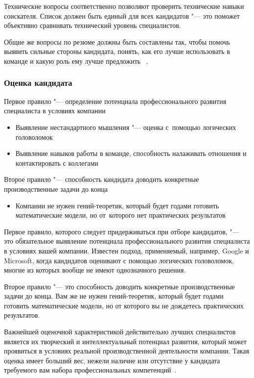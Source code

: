 \documentclass{../industrial-development}
\begin{document}
	Технические вопросы соответственно позволяют проверить технические навыки соискателя. Список должен быть единый для всех кандидатов "--- это поможет объективно сравнивать технический уровень специалистов.
	
	Общие же вопросы по резюме должны быть составлены так, чтобы помочь выявить сильные стороны кандидата, понять, как его лучше использовать в команде и какую роль ему лучше предложить
	~\cite[с.~280--281]{Pererva}.
	
	\begin{frame} \frametitle{Оценка кандидата}
		
		Первое правило "--- определение потенциала профессионального развития специалиста в условиях компании
		\begin{itemize}
			\item Выявление нестандартного мышления "--- оценка с~помощью логических головоломок
			\item Выявление навыков работы в команде, способность налаживать отношения и контактировать с коллегами
		\end{itemize}
		
		Второе правило "--- способность кандидата доводить конкретные производственные задачи до конца 
		\begin{itemize}
			\item Компании не нужен гений-теоретик, который будет годами готовить математические модели, но от~которого нет практических результатов
			
		\end{itemize}
	\end{frame}
	
	\lecturenotes
	
	Первое правило, которого следует придерживаться при отборе кандидатов, "--- это обязательное выявление потенциала профессионального развития специалиста в условиях вашей компании. Известен подход, применяемый, например, Google и Microsoft, когда кандидатов оценивают с помощью логических головоломок, многие из которых вообще не имеют однозначного решения.
	
	Второе правило "--- это способность доводить конкретные производственные задачи до конца. Вам же не нужен гений-теоретик, который будет годами готовить математические модели, но от которого вы не дождетесь практических результатов.
	
	Важнейшей оценочной характеристикой действительно лучших специалистов является их творческий и интеллектуальный потенциал развития, который может проявиться в условиях реальной производственной деятельности компании. Такая оценка имеет больший вес, нежели наличие или отсутствие у кандидата требуемого вам набора профессиональных компетенций~\cite[с.~287]{Pererva}.
	
\end{document}
